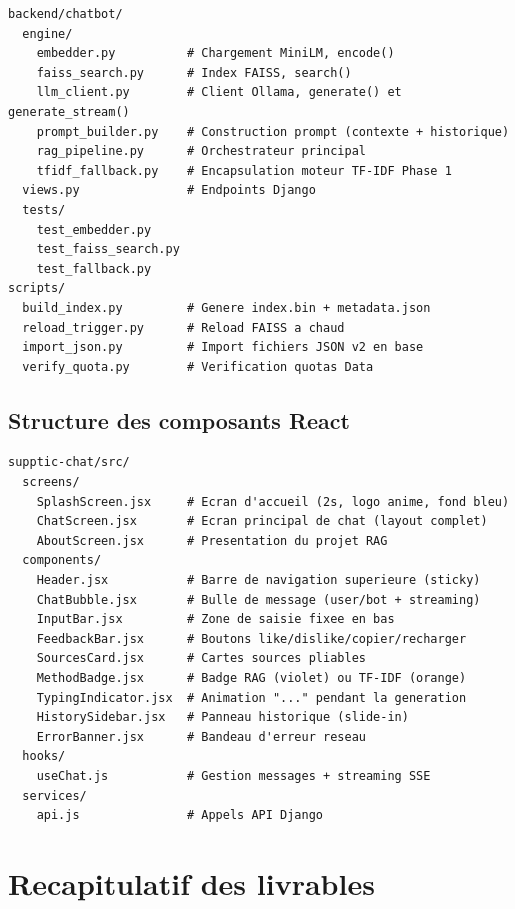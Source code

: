 \documentclass[11pt,a4paper]{article}
\begin{document}
\begin{lstlisting}[caption=Arborescence backend (engine)]
backend/chatbot/
  engine/
    embedder.py          # Chargement MiniLM, encode()
    faiss_search.py      # Index FAISS, search()
    llm_client.py        # Client Ollama, generate() et generate_stream()
    prompt_builder.py    # Construction prompt (contexte + historique)
    rag_pipeline.py      # Orchestrateur principal
    tfidf_fallback.py    # Encapsulation moteur TF-IDF Phase 1
  views.py               # Endpoints Django
  tests/
    test_embedder.py
    test_faiss_search.py
    test_fallback.py
scripts/
  build_index.py         # Genere index.bin + metadata.json
  reload_trigger.py      # Reload FAISS a chaud
  import_json.py         # Import fichiers JSON v2 en base
  verify_quota.py        # Verification quotas Data
\end{lstlisting}

\subsection{Structure des composants React}

\begin{lstlisting}[caption=Arborescence frontend]
supptic-chat/src/
  screens/
    SplashScreen.jsx     # Ecran d'accueil (2s, logo anime, fond bleu)
    ChatScreen.jsx       # Ecran principal de chat (layout complet)
    AboutScreen.jsx      # Presentation du projet RAG
  components/
    Header.jsx           # Barre de navigation superieure (sticky)
    ChatBubble.jsx       # Bulle de message (user/bot + streaming)
    InputBar.jsx         # Zone de saisie fixee en bas
    FeedbackBar.jsx      # Boutons like/dislike/copier/recharger
    SourcesCard.jsx      # Cartes sources pliables
    MethodBadge.jsx      # Badge RAG (violet) ou TF-IDF (orange)
    TypingIndicator.jsx  # Animation "..." pendant la generation
    HistorySidebar.jsx   # Panneau historique (slide-in)
    ErrorBanner.jsx      # Bandeau d'erreur reseau
  hooks/
    useChat.js           # Gestion messages + streaming SSE
  services/
    api.js               # Appels API Django
\end{lstlisting}

\clearpage

\section{Recapitulatif des livrables}
\end{document}
